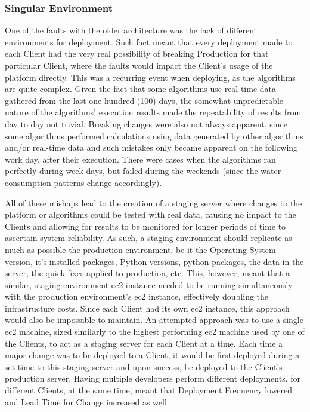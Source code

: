 \subsubsection{Singular Environment}\label{methodology:sss:singular-environment}

One of the faults with the older architecture was the lack of different environments for deployment. Such fact meant that every deployment made to each Client had the very real possibility of breaking Production for that particular Client, where the faults would impact the Client's usage of the platform directly. This was a recurring event when deploying, as the algorithms are quite complex. Given the fact that some algorithms use real-time data gathered from the last one hundred (100) days, the somewhat unpredictable nature of the algorithms' execution results made the repeatability of results from day to day not trivial.
Breaking changes were also not always apparent, since some algorithms performed calculations using data generated by other algorithms and/or real-time data and such mistakes only became apparent on the following work day, after their execution. There were cases when the algorithms ran perfectly during week days, but failed during the weekends (since the water consumption patterns change accordingly).

All of these mishaps lead to the creation of a staging server where changes to the platform or algorithms could be tested with real data, causing no impact to the Clients and allowing for results to be monitored for longer periods of time to ascertain system reliability. As such, a staging environment should replicate as much as possible the production environment, be it the Operating System version, it's installed packages, Python versions, python packages, the data in the server, the quick-fixes applied to production, etc.
This, however, meant that a similar, staging environment \gls{ec2} instance needed to be running simultaneously with the production environment's \gls{ec2} instance, effectively doubling the infrastructure costs. Since each Client had its own \gls{ec2} instance, this approach would also be impossible to maintain. An attempted approach was to use a single \gls{ec2} machine, sized similarly to the highest performing \gls{ec2} machine used by one of the Clients, to act as a staging server for each Client at a time. Each time a major change was to be deployed to a Client, it would be first deployed during a set time to this staging server and upon success, be deployed to the Client's production server. Having multiple developers perform different deployments, for different Clients, at the same time, meant that Deployment Frequency lowered and Lead Time for Change increased as well.



